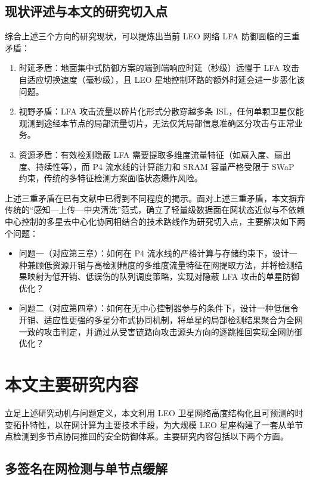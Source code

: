 \subsection{现状评述与本文的研究切入点}

综合上述三个方向的研究现状，可以提炼出当前 LEO 网络 LFA 防御面临的三重矛盾：

\begin{enumerate}
    \item 时延矛盾：地面集中式防御方案的端到端响应时延（秒级）远慢于 LFA 攻击自适应切换速度（毫秒级），且 LEO 星地控制环路的额外时延会进一步恶化该问题。
    \item 视野矛盾：LFA 攻击流量以碎片化形式分散穿越多条 ISL，任何单颗卫星仅能观测到途经本节点的局部流量切片，无法仅凭局部信息准确区分攻击与正常业务。
    \item 资源矛盾：有效检测隐蔽 LFA 需要提取多维度流量特征（如扇入度、扇出度、持续性等），而 P4 流水线的计算能力和 SRAM 容量严格受限于 SWaP 约束，传统的多特征检测方案面临状态爆炸风险。
\end{enumerate}

上述三重矛盾在已有文献中已得到不同程度的揭示。面对上述三重矛盾，本文摒弃传统的“感知—上传—中央清洗”范式，确立了轻量级数据面在网状态近似与不依赖中心控制的多星去中心化协同相结合的技术路线作为研究切入点，主要解决如下两个问题：
\begin{itemize}
    \item 问题一（对应第三章）：如何在 P4 流水线的严格计算与存储约束下，设计一种兼顾低资源开销与高检测精度的多维度流量特征在网提取方法，并将检测结果映射为低开销、低误伤的队列调度策略，实现对隐蔽 LFA 攻击的单星防御优化？
    \item 问题二（对应第四章）：如何在无中心控制器参与的条件下，设计一种低信令开销、适应性更强的多星分布式协同机制，将单星的局部检测结果聚合为全网一致的攻击判定，并通过从受害链路向攻击源头方向的逐跳推回实现全网防御优化？
\end{itemize}

\section{本文主要研究内容}

立足上述研究动机与问题定义，本文利用 LEO 卫星网络高度结构化且可预测的时变拓扑特性，以在网计算为主要技术手段，为大规模 LEO 星座构建了一套从单节点检测到多节点协同推回的安全防御体系。主要研究内容包括以下两个方面。

\subsection{多签名在网检测与单节点缓解}

